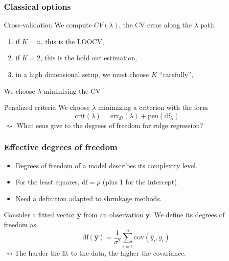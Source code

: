 \documentclass[10pt, c, xcolor=x11names]{beamer}\usepackage[]{graphicx}\usepackage[]{color}
\begin{document}
\begin{frame}
   \frametitle{Classical options}

 \begin{block}{Cross-validation}
   We compute $CV(\lambda)$, the CV error along the $\lambda$ path
    \begin{enumerate}
    \item if $K=n$, this is the LOOCV,
    \item if $K=2$, this is the hold out estimation,
    \item in a high dimensional setup, we must choose $K$ ``carefully'',
    \end{enumerate}
   We choose  $\lambda$ minimising the CV 
  \end{block}

\vfill

\begin{block}{Penalized criteria}
We choose  $\lambda$ minimizing a criterion with the form
\begin{equation*}
\mathrm{crit}(\lambda) = \mathrm{err}_\mathcal{D}(\lambda) + \mathrm{pen}(\mathrm{df}_\lambda)
\end{equation*}
$\rightsquigarrow$ What sens give to the degrees of freedom for ridge regression?
\end {block}

\end{frame}


\begin{frame}
  \frametitle{Effective degrees of freedom}

  \begin{itemize}
  \item Degrees of freedom of a model describes its complexity level.
  \item For the least squares, $\mathrm{df} = p$ (plus 1 for the intercept).
  \item Need a definition adapted to shrinkage methods.
  \end{itemize}

  \vfill

  \begin{definition}   Consider  a  fitted  vector
    $\hat{\mathbf{y}}$ from an observation $\mathbf{y}$. We define its
    degrees of freedom as
    \begin{equation*}
      \mathrm{df}(\hat{\mathbf{y}})    =    \frac{1}{\sigma^2}
      \sum_{i=1}^n \mathrm{cov}(\hat{y}_i,y_i).
    \end{equation*}
    $\rightsquigarrow$The  harder the fit  to the  data, the  higher the
    covariance.
  \end{definition}

\end{frame}
\end{document}
